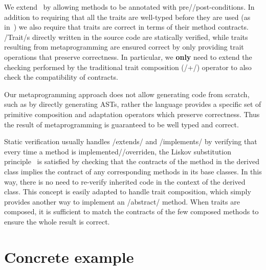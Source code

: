
We extend~\cite{servetto2014meta} by allowing
methods to be annotated with pre//post-conditions.
In addition to requiring that all the traits are well-typed before they are used (as in~\cite{servetto2014meta}) we also require that traits are correct in terms of their method contracts.
/Trait/s directly written in the source code are statically verified, while traits resulting from metaprogramming are ensured correct by only providing trait operations that preserve correctness. 
In particular, we \textbf{only} need to extend the checking performed by the traditional trait composition (/+/)  operator to also check the compatibility of contracts.

%
%
Our metaprogramming approach does not allow generating code from scratch, such as by directly generating ASTs, rather the language provides a specific set of primitive composition and adaptation operators which preserve correctness.
Thus the result of metaprogramming is guaranteed to be well typed and correct.


Static verification usually handles /extends/ and /implements/ by verifying that every 
time a method is implemented//overriden, 
the Liskov substitution principle~\cite{Liskov:1994:BNS:197320.197383} is satisfied
by checking that the contracts of the method in the derived class implies the contract of any corresponding methods in its base classes. 
 In this way, there is no need to re-verify
inherited code in the context of the derived class.
This concept is easily adapted
to handle trait composition, which simply provides another way to implement an /abstract/ method.
When traits are composed,
it is sufficient
to match the contracts of the few composed methods
to ensure the whole result is correct.

\section{Concrete example}

